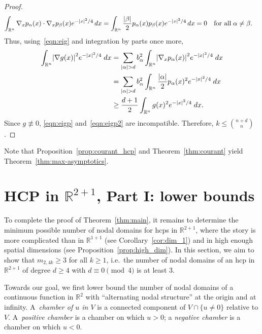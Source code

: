 \documentclass[10pt]{amsart}
\theoremstyle{definition}\newtheorem{defi}[theo]{Definition}\newtheorem{rema}[theo]{Remark}\newtheorem{exam}[theo]{Example}\newtheorem{exem}[theo]{Example}\newtheorem{nota}[theo]{Notation}
\newcommand{\R}{\mathbb{R}}
\newcommand{\abs}[1]{\left \lvert #1 \right \rvert}
\let\originalleft\left
\let\originalright\right
\renewcommand{\left}{\mathopen{}\mathclose\bgroup\originalleft}
\renewcommand{\right}{\aftergroup\egroup\originalright}
\begin{document}
\begin{proof}
\begin{align*}
\int_{\R^n} \nabla_x p_\alpha(x)\cdot \nabla_x p_\beta(x) e^{-\abs{x}^2/4} \, dx & = \int_{\R^n} \frac{\abs{\beta}}{2} p_\alpha(x) p_\beta(x) e^{-\abs{x}^2/4} \, dx = 0\quad\text{for all}\;\alpha\neq\beta.
\end{align*}
Thus, using~\eqref{eqn:eig} and integration by parts once more,
\begin{equation}\label{eqn:eigp2}
\begin{aligned}[t]
\int_{\R^n} \abs{\nabla g(x)}^2 e^{-\abs{x}^2/4} \; dx &= \sum_{\abs{\alpha} > d} b_\alpha^2 \int_{\R^n} \abs{\nabla_x p_\alpha(x)}^2 e^{-\abs{x}^2/4} \; dx \\
&= \sum_{\abs{\alpha} > d} b_\alpha^2 \int_{\R^n} \frac{\abs{\alpha}}{2} p_\alpha(x)^2 e^{-\abs{x}^2/4} \; dx \\
&\ge \frac{d+1}{2} \int_{\R^n} g(x)^2 e^{-\abs{x}^2/4} \; dx.
\end{aligned}
\end{equation}
Since $g\not\equiv 0$, \eqref{eqn:eigp} and~\eqref{eqn:eigp2} are incompatible. Therefore, $k \le \binom{n+d}{n}$.
\end{proof}

Note that Proposition~\ref{prop:courant_hcp} and Theorem~\ref{thm:courant} yield Theorem~\ref{thm:max-asymptotics}.

\section{HCP in \texorpdfstring{$\R^{2+1}$}{2+1 dimensions}, Part I: lower bounds}\label{sec:dim_3_low}

To complete the proof of Theorem~\ref{thm:main}, it remains to determine the minimum possible number of nodal domains for hcps in $\R^{2+1}$, where the story is more complicated than in $\R^{1+1}$ (see Corollary~\ref{cor:dim_1}) and in high enough spatial dimensions (see Proposition~\ref{prop:high_dim}). In this section, we aim to show that $m_{2,4k}\geq 3$ for all $k\geq 1$, i.e.~the number of nodal domains of an hcp in $\R^{2+1}$ of degree $d\geq 4$ with $d \equiv 0 \pmod 4$ is at least 3.

Towards our goal, we first lower bound the number of nodal domains of a continuous function in $\R^2$ with ``alternating nodal structure'' at the origin and at infinity. A~\emph{chamber of $u$ in $V$} is a connected component of $V \cap \{ u \ne 0\}$ relative to $V$. A~\emph{positive chamber} is a chamber on which $u>0$; a \emph{negative chamber} is a chamber on which $u<0$.
\end{document}
